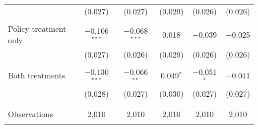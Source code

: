\begin{tabular}{@{\extracolsep{5pt}}lccccc}
  & (0.027) & (0.027) & (0.029) & (0.026) & (0.026) \\ 
  & & & & & \\ 
 Policy treatment only & $-$0.106$^{***}$ & $-$0.068$^{***}$ & 0.018 & $-$0.039 & $-$0.025 \\ 
  & (0.027) & (0.026) & (0.029) & (0.026) & (0.026) \\ 
  & & & & & \\ 
 Both treatments & $-$0.130$^{***}$ & $-$0.066$^{**}$ & 0.049$^{*}$ & $-$0.051$^{*}$ & $-$0.041 \\ 
  & (0.028) & (0.027) & (0.030) & (0.027) & (0.027) \\ 
  & & & & & \\ 
\hline \\[-1.8ex] 

Observations & 2,010 & 2,010 & 2,010 & 2,010 & 2,010 \\ 
\hline 
\hline \\[-1.8ex] 
\end{tabular} 